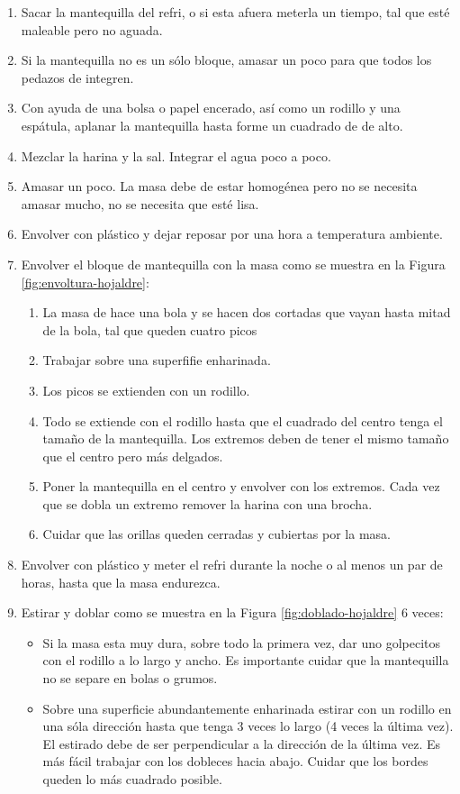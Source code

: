 \begin{enumerate}
\item Sacar la mantequilla del refri, o si esta afuera meterla un tiempo, tal que esté maleable pero no aguada.
\item Si la mantequilla no es un sólo bloque, amasar un poco para que todos los pedazos de integren.
\item Con ayuda de una bolsa o papel encerado, así como un rodillo y una espátula, aplanar la mantequilla hasta forme un cuadrado de \Sim 1cm de alto.
\item Mezclar la harina y la sal. Integrar el agua poco a poco.
\item Amasar un poco. La masa debe de estar homogénea pero no se necesita amasar mucho, no se necesita que esté lisa.
\item Envolver con plástico y dejar reposar por una hora a temperatura ambiente.
\item Envolver el bloque de mantequilla con la masa como se muestra en la Figura \ref{fig:envoltura-hojaldre}:
\begin{enumerate}
\item La masa de hace una bola y se hacen dos cortadas que vayan hasta mitad de la bola, tal que queden cuatro picos
\item Trabajar sobre una superfifie enharinada.
\item Los picos se extienden con un rodillo. 
\item Todo se extiende con el rodillo hasta que el cuadrado del centro tenga el tamaño de la mantequilla. Los extremos deben de tener el mismo tamaño que el centro pero más delgados.
\item Poner la mantequilla en el centro y envolver con los extremos. Cada vez que se dobla un extremo remover la harina con una brocha.
\item Cuidar que las orillas queden cerradas y cubiertas por la masa.
\end{enumerate}
\item Envolver con plástico y meter el refri durante la noche o al menos un par de horas, hasta que la masa endurezca.
\item Estirar y doblar como se muestra en la Figura \ref{fig:doblado-hojaldre} 6 veces:
\begin{itemize}
\item Si la masa esta muy dura, sobre todo la primera vez, dar uno golpecitos con el rodillo a lo largo y ancho. Es importante cuidar que la mantequilla no se separe en bolas o grumos.
\item Sobre una superficie abundantemente enharinada estirar con un rodillo en una sóla dirección hasta que tenga 3 veces lo largo (4 veces la última vez). El estirado debe de ser perpendicular a la dirección de la última vez. Es más fácil trabajar con los dobleces hacia abajo. Cuidar que los bordes queden lo más cuadrado posible.

\end{itemize}
\end{enumerate}

